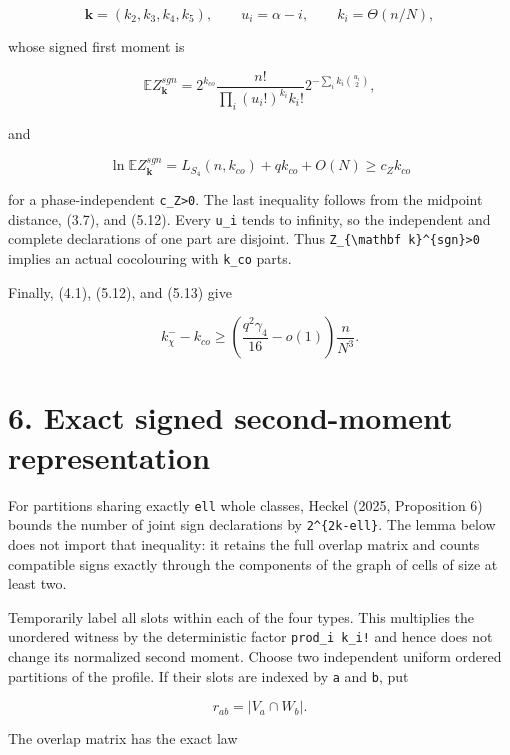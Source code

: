 \documentclass[
  11pt,
  a4paper,
]{article}
\begin{document}
\[
 \mathbf k=(k_2,k_3,k_4,k_5),\qquad
 u_i=\alpha-i,\qquad k_i=\Theta(n/N),                    \tag{5.17}
\]

whose signed first moment is

\[
 \mathbb EZ_{\mathbf k}^{sgn}
 =2^{k_{co}}\frac{n!}{\prod_i(u_i!)^{k_i}k_i!}
   2^{-\sum_i k_i\binom{u_i}{2}},                        \tag{5.18}
\]

and

\[
 \ln\mathbb EZ_{\mathbf k}^{sgn}
 =L_{S_4}(n,k_{co})+qk_{co}+O(N)
 \ge c_Zk_{co}                                          \tag{5.19}
\]

for a phase-independent \texttt{c\_Z\textgreater{}0}. The last
inequality follows from the midpoint distance, (3.7), and (5.12). Every
\texttt{u\_i} tends to infinity, so the independent and complete
declarations of one part are disjoint. Thus
\texttt{Z\_}\allowbreak{}\texttt{\{\textbackslash{}mathbf\ k\}\^{}\{sgn\}\textgreater{}}\allowbreak{}\texttt{0}
implies an actual cocolouring with \texttt{k\_co} parts.

Finally, (4.1), (5.12), and (5.13) give

\[
 k_\chi^- -k_{co}
 \ge\left(\frac{q^2\gamma_4}{16}-o(1)\right)
       \frac n{N^3}.                                    \tag{5.20}
\]

\section{6. Exact signed second-moment
representation}\label{exact-signed-second-moment-representation}

For partitions sharing exactly \texttt{ell} whole classes, Heckel (2025,
Proposition 6) bounds the number of joint sign declarations by
\texttt{2\^{}\{2k-ell\}}. The lemma below does not import that
inequality: it retains the full overlap matrix and counts compatible
signs exactly through the components of the graph of cells of size at
least two.

Temporarily label all slots within each of the four types. This
multiplies the unordered witness by the deterministic factor
\texttt{prod\_i\ k\_i!} and hence does not change its normalized second
moment. Choose two independent uniform ordered partitions of the
profile. If their slots are indexed by \texttt{a} and \texttt{b}, put

\[
 r_{ab}=|V_a\cap W_b|.                                   \tag{6.1}
\]

The overlap matrix has the exact law
\end{document}
